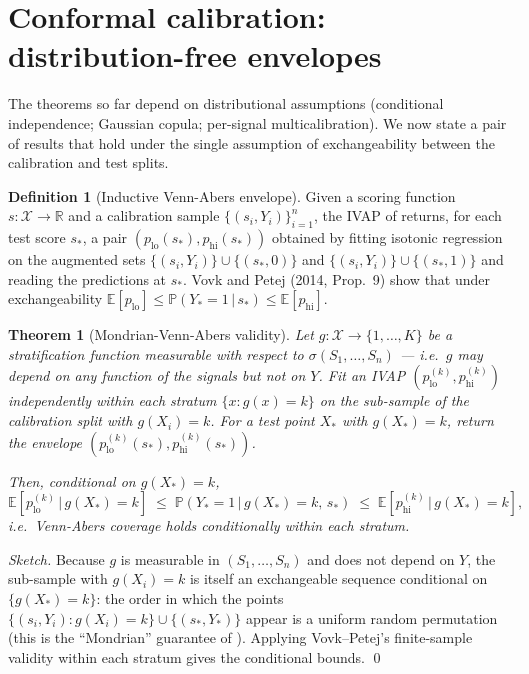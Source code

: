 \documentclass[11pt]{article}
\newtheorem{theorem}{Theorem}
\theoremstyle{definition}
\newtheorem{definition}{Definition}
\theoremstyle{remark}
\newcommand{\pr}{\mathbb{P}}
\newcommand{\expec}{\mathbb{E}}
\newcommand{\given}{\,\big|\,}
\newcommand{\setR}{\mathbb{R}}
\begin{document}
\section{Conformal calibration: distribution-free envelopes}\label{sec:conformal}

The theorems so far depend on distributional assumptions (conditional
independence; Gaussian copula; per-signal multicalibration). We now
state a pair of results that hold under the single assumption of
exchangeability between the calibration and test splits.

\begin{definition}[Inductive Venn-Abers envelope]
Given a scoring function $s: \mathcal{X} \to \setR$ and a
calibration sample $\{(s_i, Y_i)\}_{i=1}^n$, the IVAP of
\citet{vovk2014vennabers} returns, for each test score $s_*$, a pair
$(p_{\mathrm{lo}}(s_*), p_{\mathrm{hi}}(s_*))$ obtained by fitting
isotonic regression on the augmented sets
$\{(s_i, Y_i)\} \cup \{(s_*, 0)\}$ and
$\{(s_i, Y_i)\} \cup \{(s_*, 1)\}$ and reading the predictions at
$s_*$. Vovk and Petej (2014, Prop.~9) show that under exchangeability
$\expec[p_{\mathrm{lo}}] \leq \pr(Y_* = 1 \given s_*) \leq \expec[p_{\mathrm{hi}}]$.
\end{definition}

\begin{theorem}[Mondrian-Venn-Abers validity]\label{thm:mondrian}
Let $g: \mathcal{X} \to \{1, \ldots, K\}$ be a stratification function
measurable with respect to $\sigma(S_1, \ldots, S_n)$ --- i.e.\ $g$
may depend on any function of the signals but not on $Y$. Fit an
IVAP $(p^{(k)}_{\mathrm{lo}}, p^{(k)}_{\mathrm{hi}})$ independently
within each stratum $\{x : g(x) = k\}$ on the sub-sample of the
calibration split with $g(X_i) = k$. For a test point $X_*$ with
$g(X_*) = k$, return the envelope
$(p^{(k)}_{\mathrm{lo}}(s_*), p^{(k)}_{\mathrm{hi}}(s_*))$.

Then, conditional on $g(X_*) = k$,
\[
  \expec[p^{(k)}_{\mathrm{lo}} \given g(X_*) = k]
  \;\leq\; \pr(Y_* = 1 \given g(X_*) = k,\, s_*)
  \;\leq\; \expec[p^{(k)}_{\mathrm{hi}} \given g(X_*) = k],
\]
i.e.\ Venn-Abers coverage holds conditionally within each stratum.
\end{theorem}

\begin{proof}[Sketch]
Because $g$ is measurable in $(S_1, \ldots, S_n)$ and does not
depend on $Y$, the sub-sample with $g(X_i) = k$ is itself an
exchangeable sequence conditional on $\{g(X_*) = k\}$: the order in
which the points $\{(s_i, Y_i) : g(X_i) = k\} \cup \{(s_*, Y_*)\}$
appear is a uniform random permutation (this is the
``Mondrian'' guarantee of \citealp{vovk2003mondrian}). Applying
Vovk--Petej's finite-sample validity within each stratum gives the
conditional bounds. \qed
\end{proof}
\end{document}
